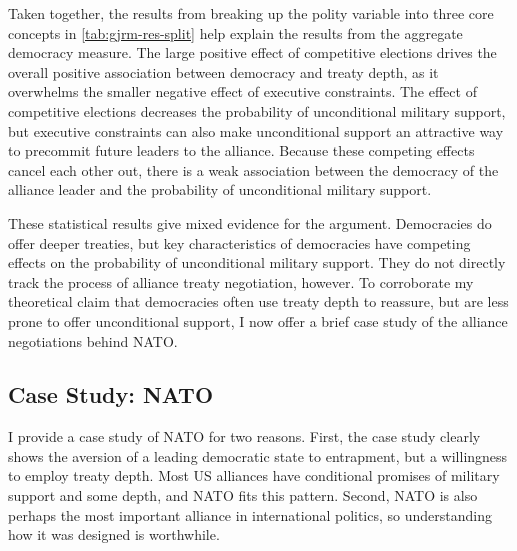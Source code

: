 \documentclass[12pt]{article}
\begin{document}
Taken together, the results from breaking up the polity variable into three core concepts in \autoref{tab:gjrm-res-split} help explain the results from the aggregate democracy measure. 
The large positive effect of competitive elections drives the overall positive association between democracy and treaty depth, as it overwhelms the smaller negative effect of executive constraints. 
The effect of competitive elections decreases the probability of unconditional military support, but executive constraints can also make unconditional support an attractive way to precommit future leaders to the alliance. 
Because these competing effects cancel each other out, there is a weak association between the democracy of the alliance leader and the probability of unconditional military support. 


These statistical results give mixed evidence for the argument. 
Democracies do offer deeper treaties, but key characteristics of democracies have competing effects on the probability of unconditional military support. 
They do not directly track the process of alliance treaty negotiation, however. 
To corroborate my theoretical claim that democracies often use treaty depth to reassure, but are less prone to offer unconditional support, I now offer a brief case study of the alliance negotiations behind NATO. 


\subsection{Case Study: NATO}


I provide a case study of NATO for two reasons. 
First, the case study clearly shows the aversion of a leading democratic state to entrapment, but a willingness to employ treaty depth. 
Most US alliances have conditional promises of military support and some depth, and NATO fits this pattern.
Second, NATO is also perhaps the most important alliance in international politics, so understanding how it was designed is worthwhile. 
\end{document}
